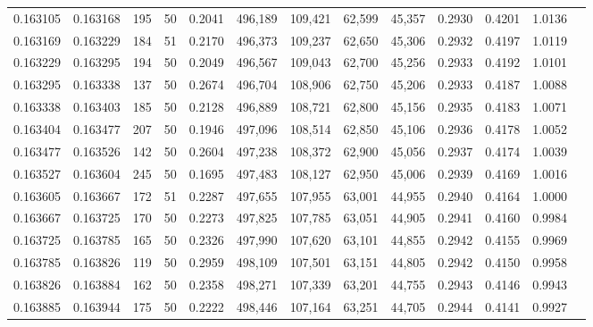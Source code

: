 \begin{tabular}{rrrrrrrrrrrrr}
0.163105 & 0.163168 &   195 &  50 &                                     0.2041 & 496,189 & 109,421 &  62,599 &  45,357 & 0.2930 & 0.4201 & 1.0136 \\
0.163169 & 0.163229 &   184 &  51 &                                     0.2170 & 496,373 & 109,237 &  62,650 &  45,306 & 0.2932 & 0.4197 & 1.0119 \\
0.163229 & 0.163295 &   194 &  50 &                                     0.2049 & 496,567 & 109,043 &  62,700 &  45,256 & 0.2933 & 0.4192 & 1.0101 \\
0.163295 & 0.163338 &   137 &  50 &                                     0.2674 & 496,704 & 108,906 &  62,750 &  45,206 & 0.2933 & 0.4187 & 1.0088 \\
0.163338 & 0.163403 &   185 &  50 &                                     0.2128 & 496,889 & 108,721 &  62,800 &  45,156 & 0.2935 & 0.4183 & 1.0071 \\
0.163404 & 0.163477 &   207 &  50 &                                     0.1946 & 497,096 & 108,514 &  62,850 &  45,106 & 0.2936 & 0.4178 & 1.0052 \\
0.163477 & 0.163526 &   142 &  50 &                                     0.2604 & 497,238 & 108,372 &  62,900 &  45,056 & 0.2937 & 0.4174 & 1.0039 \\
0.163527 & 0.163604 &   245 &  50 &                                     0.1695 & 497,483 & 108,127 &  62,950 &  45,006 & 0.2939 & 0.4169 & 1.0016 \\
0.163605 & 0.163667 &   172 &  51 &                                     0.2287 & 497,655 & 107,955 &  63,001 &  44,955 & 0.2940 & 0.4164 & 1.0000 \\
0.163667 & 0.163725 &   170 &  50 &                                     0.2273 & 497,825 & 107,785 &  63,051 &  44,905 & 0.2941 & 0.4160 & 0.9984 \\
0.163725 & 0.163785 &   165 &  50 &                                     0.2326 & 497,990 & 107,620 &  63,101 &  44,855 & 0.2942 & 0.4155 & 0.9969 \\
0.163785 & 0.163826 &   119 &  50 &                                     0.2959 & 498,109 & 107,501 &  63,151 &  44,805 & 0.2942 & 0.4150 & 0.9958 \\
0.163826 & 0.163884 &   162 &  50 &                                     0.2358 & 498,271 & 107,339 &  63,201 &  44,755 & 0.2943 & 0.4146 & 0.9943 \\
0.163885 & 0.163944 &   175 &  50 &                                     0.2222 & 498,446 & 107,164 &  63,251 &  44,705 & 0.2944 & 0.4141 & 0.9927 \\

\end{tabular}
